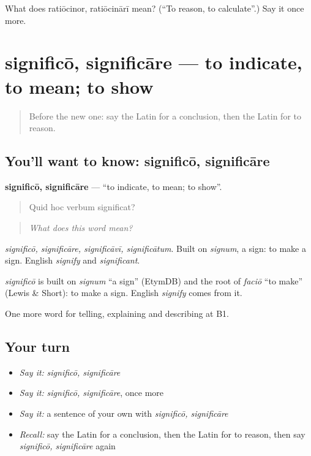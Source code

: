 \begin{tcolorbox}[breakable,colback=teal!4,colframe=teal!35!black,title={Before you move on}]
What does ratiōcinor, ratiōcinārī mean? (\textquotedblleft{}To reason, to calculate\textquotedblright{}.) Say it once more.
\end{tcolorbox}
\section[significō, significāre]{significō, significāre — to indicate, to mean; to show}

\label{lesson:LA-C364-significo}



\begin{quote}
Before the new one: say the Latin for a conclusion, then the Latin for to reason.
\end{quote}

\subsection*{You'll want to know: significō, significāre}
\textbf{significō, significāre} — \textquotedblleft{}to indicate, to mean; to show\textquotedblright{}.

\begin{quote}
Quid hoc verbum significat?
\end{quote}

\begin{quote}
\emph{What does this word mean?}
\end{quote}

\emph{significō, significāre, significāvī, significātum}. Built on \emph{signum}, a sign: to make a sign. English \emph{signify} and \emph{significant}.

\begin{cousinweb}
\emph{significō} is built on \emph{signum} \textquotedblleft{}a sign\textquotedblright{} (EtymDB) and the root of \emph{faciō} \textquotedblleft{}to make\textquotedblright{} (Lewis \& Short): to make a sign. English \emph{signify} comes from it.
\end{cousinweb}

\begin{grammarlens}[title={What you've built}]
One more word for telling, explaining and describing at B1.
\end{grammarlens}

\subsection*{Your turn}
\begin{itemize}
\raggedright
  \item \emph{Say it:} \emph{significō, significāre}
  \item \emph{Say it:} \emph{significō, significāre}, once more
  \item \emph{Say it:} a sentence of your own with \emph{significō, significāre}
  \item \emph{Recall:} say the Latin for a conclusion, then the Latin for to reason, then say \emph{significō, significāre} again
\end{itemize}

